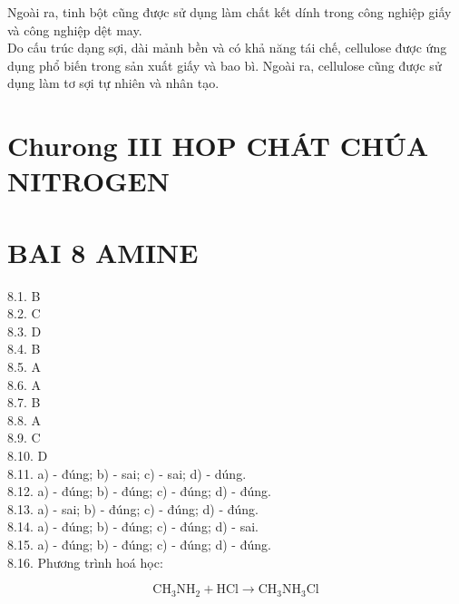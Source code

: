 \documentclass[10pt]{article}
\begin{document}
Ngoài ra, tinh bột cũng được sử dụng làm chất kết dính trong công nghiệp giấy và công nghiệp dệt may.\\
Do cấu trúc dạng sợi, dài mảnh bền và có khả năng tái chế, cellulose được ứng dụng phổ biến trong sản xuất giấy và bao bì. Ngoài ra, cellulose cũng được sử dụng làm tơ sợi tự nhiên và nhân tạo.

\section*{Churong III HOP CHÁT CHÚA NITROGEN}
\section*{BAI 8 AMINE}
8.1. B\\
8.2. C\\
8.3. D\\
8.4. B\\
8.5. A\\
8.6. A\\
8.7. B\\
8.8. A\\
8.9. C\\
8.10. D\\
8.11. a) - đúng; b) - sai; c) - sai; d) - dúng.\\
8.12. a) - đúng; b) - đúng; c) - đúng; d) - đúng.\\
8.13. a) - sai; b) - đúng; c) - đúng; d) - đúng.\\
8.14. a) - đúng; b) - đúng; c) - đúng; d) - sai.\\
8.15. a) - đúng; b) - đúng; c) - đúng; d) - đúng.\\
8.16. Phương trình hoá học:

$$
\mathrm{CH}_{3} \mathrm{NH}_{2}+\mathrm{HCl} \rightarrow \mathrm{CH}_{3} \mathrm{NH}_{3} \mathrm{Cl}
$$
\end{document}

